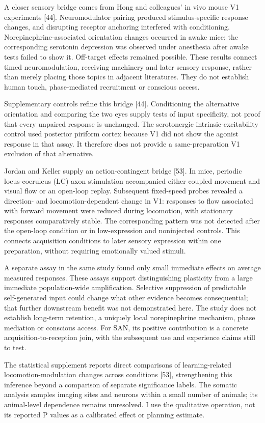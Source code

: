 \documentclass[
  american,
  11pt,
  letterpaper,
]{article}
\begin{document}
A closer sensory bridge comes from Hong and colleagues' in vivo mouse V1 experiments {[}44{]}. Neuromodulator pairing produced stimulus-specific response changes, and disrupting receptor anchoring interfered with conditioning. Norepinephrine-associated orientation changes occurred in awake mice; the corresponding serotonin depression was observed under anesthesia after awake tests failed to show it. Off-target effects remained possible. These results connect timed neuromodulation, receiving machinery and later sensory response, rather than merely placing those topics in adjacent literatures. They do not establish human touch, phase-mediated recruitment or conscious access.

Supplementary controls refine this bridge {[}44{]}. Conditioning the alternative orientation and comparing the two eyes supply tests of input specificity, not proof that every unpaired response is unchanged. The serotonergic intrinsic-excitability control used posterior piriform cortex because V1 did not show the agonist response in that assay. It therefore does not provide a same-preparation V1 exclusion of that alternative.

Jordan and Keller supply an action-contingent bridge {[}53{]}. In mice, periodic locus-coeruleus (LC) axon stimulation accompanied either coupled movement and visual flow or an open-loop replay. Subsequent fixed-speed probes revealed a direction- and locomotion-dependent change in V1: responses to flow associated with forward movement were reduced during locomotion, with stationary responses comparatively stable. The corresponding pattern was not detected after the open-loop condition or in low-expression and noninjected controls. This connects acquisition conditions to later sensory expression within one preparation, without requiring emotionally valued stimuli.

A separate assay in the same study found only small immediate effects on average measured responses. These assays support distinguishing plasticity from a large immediate population-wide amplification. Selective suppression of predictable self-generated input could change what other evidence becomes consequential; that further downstream benefit was not demonstrated here. The study does not establish long-term retention, a uniquely local norepinephrine mechanism, phase mediation or conscious access. For SAN, its positive contribution is a concrete acquisition-to-reception join, with the subsequent use and experience claims still to test.

The statistical supplement reports direct comparisons of learning-related locomotion-modulation changes across conditions {[}53{]}, strengthening this inference beyond a comparison of separate significance labels. The somatic analysis samples imaging sites and neurons within a small number of animals; its animal-level dependence remains unresolved. I use the qualitative operation, not its reported P values as a calibrated effect or planning estimate.
\end{document}
